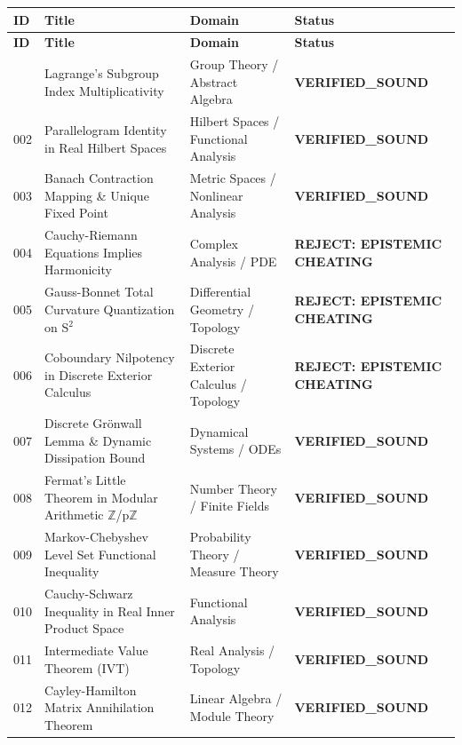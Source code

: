 \documentclass[10pt,a4paper]{article}
\begin{document}
\begin{longtable}{p{0.8cm} p{7.0cm} p{3.8cm} p{3.0cm}}
\toprule
\textbf{ID} & \textbf{Title} & \textbf{Domain} & \textbf{Status} \\
\midrule
\endfirsthead
\toprule
\textbf{ID} & \textbf{Title} & \textbf{Domain} & \textbf{Status} \\
\midrule
\endhead
\bottomrule
\endfoot
\bottomrule
\endlastfoot
001 & Lagrange's Subgroup Index Multiplicativity & Group Theory / Abstract Algebra & \textcolor{green!70!black}{\textbf{VERIFIED\_SOUND}} \\
002 & Parallelogram Identity in Real Hilbert Spaces & Hilbert Spaces / Functional Analysis & \textcolor{green!70!black}{\textbf{VERIFIED\_SOUND}} \\
003 & Banach Contraction Mapping \& Unique Fixed Point & Metric Spaces / Nonlinear Analysis & \textcolor{green!70!black}{\textbf{VERIFIED\_SOUND}} \\
004 & Cauchy-Riemann Equations Implies Harmonicity & Complex Analysis / PDE & \textcolor{red!80!black}{\textbf{REJECT: EPISTEMIC CHEATING}} \\
005 & Gauss-Bonnet Total Curvature Quantization on S$^2$ & Differential Geometry / Topology & \textcolor{red!80!black}{\textbf{REJECT: EPISTEMIC CHEATING}} \\
006 & Coboundary Nilpotency in Discrete Exterior Calculus & Discrete Exterior Calculus / Topology & \textcolor{red!80!black}{\textbf{REJECT: EPISTEMIC CHEATING}} \\
007 & Discrete Grönwall Lemma \& Dynamic Dissipation Bound & Dynamical Systems / ODEs & \textcolor{green!70!black}{\textbf{VERIFIED\_SOUND}} \\
008 & Fermat's Little Theorem in Modular Arithmetic $\mathbb{Z}$/p$\mathbb{Z}$ & Number Theory / Finite Fields & \textcolor{green!70!black}{\textbf{VERIFIED\_SOUND}} \\
009 & Markov-Chebyshev Level Set Functional Inequality & Probability Theory / Measure Theory & \textcolor{green!70!black}{\textbf{VERIFIED\_SOUND}} \\
010 & Cauchy-Schwarz Inequality in Real Inner Product Space & Functional Analysis & \textcolor{green!70!black}{\textbf{VERIFIED\_SOUND}} \\
011 & Intermediate Value Theorem (IVT) & Real Analysis / Topology & \textcolor{green!70!black}{\textbf{VERIFIED\_SOUND}} \\
012 & Cayley-Hamilton Matrix Annihilation Theorem & Linear Algebra / Module Theory & \textcolor{green!70!black}{\textbf{VERIFIED\_SOUND}} \\

\end{longtable}
\end{document}
